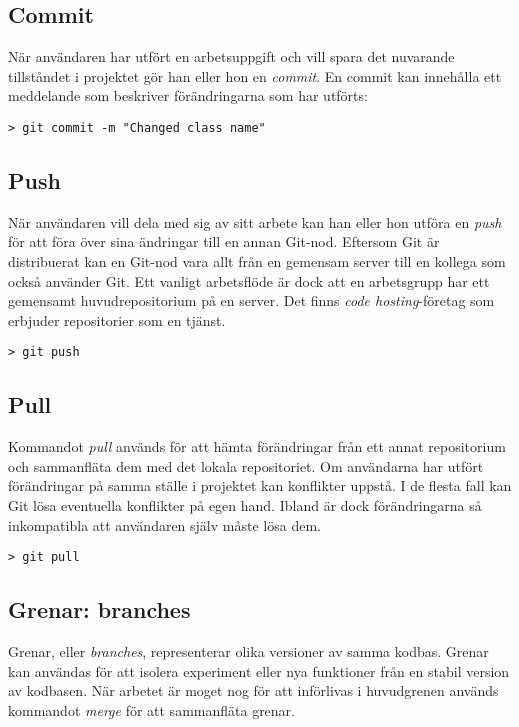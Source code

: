 \subsection{Commit}
När användaren har utfört en arbetsuppgift och vill spara det nuvarande tillståndet i projektet gör han eller hon en \emph{commit}. En commit kan innehålla ett meddelande som beskriver förändringarna som har utförts:

\begin{Verbatim}
> git commit -m "Changed class name"
\end{Verbatim}

\subsection{Push}
När användaren vill dela med sig av sitt arbete kan han eller hon utföra en \emph{push} för att föra över sina ändringar till en annan Git-nod. Eftersom Git är distribuerat kan en Git-nod vara allt från en gemensam server till en kollega som också använder Git. Ett vanligt arbetsflöde är dock att en arbetsgrupp har ett gemensamt huvudrepositorium på en server. Det finns \emph{code hosting}-företag som erbjuder repositorier som en tjänst.
\begin{Verbatim}
> git push
\end{Verbatim}

\subsection{Pull}
Kommandot \emph{pull} används för att hämta förändringar från ett annat repositorium och sammanfläta dem med det lokala repositoriet. Om användarna har utfört förändringar på samma ställe i projektet kan konflikter uppstå. I de flesta fall kan Git lösa eventuella konflikter på egen hand. Ibland är dock förändringarna så inkompatibla att användaren själv måste lösa dem.

\begin{Verbatim}
> git pull
\end{Verbatim}

\subsection{Grenar: branches}
Grenar, eller \emph{branches}, representerar olika versioner av samma kodbas. Grenar kan användas för att isolera experiment eller nya funktioner från en stabil version av kodbasen. När arbetet är moget nog för att införlivas i huvudgrenen används kommandot \emph{merge} för att sammanfläta grenar.

